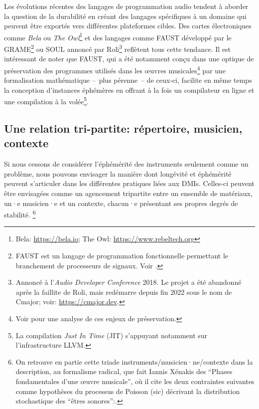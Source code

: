 \indent Les évolutions récentes des langages de programmation audio tendent à aborder la question de la durabilité en créant des langages spécifiques à un domaine qui peuvent être exportés vers différentes plateformes cibles. Des cartes électroniques comme \textit{Bela} ou \textit{The Owl}\footnote{Bela: \url{https://bela.io}; The Owl: \url{https://www.rebeltech.org}} et des langages comme \gls{FAUST} développé par le \gls{GRAME}\footnote{FAUST est un langage de programmation fonctionnelle permettant le branchement de processeurs de signaux. Voir \cite{orlarey_faust_2008}.} ou SOUL annoncé par Roli\footnote{Annoncé à l'\textit{Audio Developer Conference} 2018. Le projet a été abandonné après la faillite de Roli, mais redémarre depuis fin 2022 sous le nom de Cmajor; voir: \url{https://cmajor.dev}.} reflètent tous cette tendance. Il est intéressant de noter que \gls{FAUST}, qui a été notamment conçu dans une optique de préservation des programmes utilisés dans les œuvres musicales\footnote{Voir \cite{barkati_denumeriser_2012} pour une analyse de ces enjeux de préservation.} par une formalisation mathématique --~plus pérenne~-- de ceux-ci, facilite en même temps la conception d'instances éphémères en offrant à la fois un compilateur en ligne et une compilation à la volée\footnote{La compilation \textit{Just In Time} (JIT) s'appuyant notamment sur l'infrastructure \gls{LLVM}.}.
	
\subsection{Une relation tri-partite: répertoire, musicien, contexte}

\noindent Si nous cessons de considérer l'éphémérité des instruments seulement comme un problème, nous pouvons envisager la manière dont longévité et éphémérité peuvent s'articuler dans les différentes pratiques liées aux \glspl{DMI}. Celles-ci peuvent être envisagées comme un agencement tripartite entre un ensemble de matériaux, un·e musicien·e et un contexte, chacun·e présentant ses propres degrés de stabilité. \footnote{On retrouve en partie cette triade instruments/musicien·ne/contexte dans la description, au formalisme radical, que fait Iannis Xénakis des ``Phases fondamentales d'une œuvre musicale'', où il cite les deux contraintes suivantes comme hypothèses du processus de Poisson (sic) décrivant la distribution stochastique des ``êtres sonores'':\cite{xenakis_musiques_1963}.}

